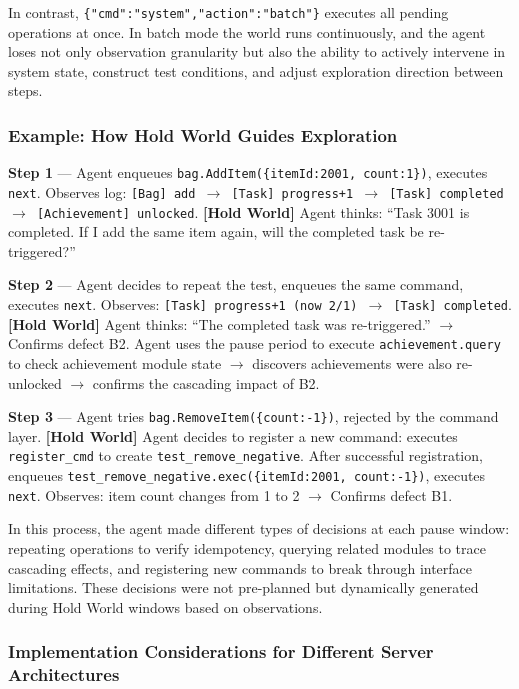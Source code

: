 \documentclass[sigconf,nonacm]{acmart}
\begin{document}
In contrast, \texttt{\{"cmd":"system","action":"batch"\}} executes all pending operations at once. In batch mode the world runs continuously, and the agent loses not only observation granularity but also the ability to actively intervene in system state, construct test conditions, and adjust exploration direction between steps.

\subsubsection{Example: How Hold World Guides Exploration}

\textbf{Step 1} --- Agent enqueues \texttt{bag.AddItem(\{itemId:2001, count:1\})}, executes \texttt{next}. Observes log: \texttt{[Bag] add $\to$ [Task] progress+1 $\to$ [Task] completed $\to$ [Achievement] unlocked}. \textbf{[Hold World]} Agent thinks: ``Task 3001 is completed. If I add the same item again, will the completed task be re-triggered?''

\textbf{Step 2} --- Agent decides to repeat the test, enqueues the same command, executes \texttt{next}. Observes: \texttt{[Task] progress+1 (now 2/1) $\to$ [Task] completed}. \textbf{[Hold World]} Agent thinks: ``The completed task was re-triggered.'' $\to$ Confirms defect B2. Agent uses the pause period to execute \texttt{achievement.query} to check achievement module state $\to$ discovers achievements were also re-unlocked $\to$ confirms the cascading impact of B2.

\textbf{Step 3} --- Agent tries \texttt{bag.RemoveItem(\{count:-1\})}, rejected by the command layer. \textbf{[Hold World]} Agent decides to register a new command: executes \texttt{register\_cmd} to create \texttt{test\_remove\_negative}. After successful registration, enqueues \texttt{test\_remove\_negative.exec(\{itemId:2001, count:-1\})}, executes \texttt{next}. Observes: item count changes from 1 to 2 $\to$ Confirms defect B1.

In this process, the agent made different types of decisions at each pause window: repeating operations to verify idempotency, querying related modules to trace cascading effects, and registering new commands to break through interface limitations. These decisions were not pre-planned but dynamically generated during Hold World windows based on observations.

\subsubsection{Implementation Considerations for Different Server Architectures}
\end{document}
